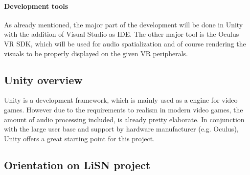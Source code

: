 \documentclass[a4paper,11pt]{article}%
\renewcommand{\\}{\vspace*{0.5\baselineskip} \newline}
\begin{document}



\paragraph{Development tools} As already mentioned, the major part of the development will be done in Unity with the addition of Visual Studio as IDE. The other major tool is the Oculus VR SDK, which will be used for audio spatialization and of course rendering the visuals to be properly displayed on the given VR peripherals.



\subsection{Unity overview}
\label{sec:unity}
Unity is a development framework, which is mainly used as a engine for video games. However due to the requirements to realism in modern video games, the amount of audio processing included, is already pretty elaborate. In conjunction with the large user base and support by hardware manufacturer (e.g. Oculus), Unity offers a great starting point for this project.


\subsection{Orientation on LiSN project}
\end{document}
